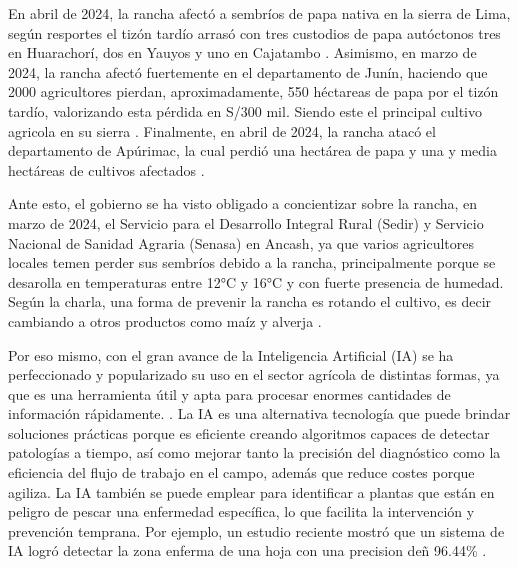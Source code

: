  En abril de 2024, la rancha afectó a sembríos de papa nativa en la sierra de Lima, según resportes el tizón tardío arrasó con tres custodios de papa autóctonos tres en Huarachorí, dos en Yauyos y uno en Cajatambo \parencite{cr_rancha3}. Asimismo, en marzo de 2024, la rancha afectó fuertemente en el departamento de Junín, haciendo que 2000 agricultores pierdan, aproximadamente, 550 héctareas de papa por el tizón tardío, valorizando esta pérdida en S/300 mil. Siendo este el principal cultivo agricola en su sierra \parencite{cr_rancha4}. Finalmente, en abril de 2024, la rancha atacó el departamento de Apúrimac, la cual perdió una hectárea de papa y una y media hectáreas de cultivos afectados \parencite{cr_rancha5}.
 
 Ante esto, el gobierno se ha visto obligado a concientizar sobre la rancha, en marzo de 2024, el Servicio para el Desarrollo Integral Rural (Sedir) y Servicio Nacional de Sanidad Agraria (Senasa) en Ancash, ya que varios agricultores locales temen perder sus sembríos debido a la rancha, principalmente porque se desarolla en temperaturas entre 12°C y 16°C y con fuerte presencia de humedad. Según la charla, una forma de prevenir la rancha es rotando el cultivo, es decir cambiando a otros productos como maíz y alverja \parencite{cr_agroinforma2}.
 
 Por eso mismo, con el gran avance de la Inteligencia Artificial (IA) se ha perfeccionado y popularizado su uso en el sector agrícola de distintas formas, ya que es una herramienta útil y apta para procesar enormes cantidades de información rápidamente. . La IA es una alternativa tecnología que puede brindar soluciones prácticas porque es eficiente creando algoritmos capaces de detectar patologías a tiempo, así como mejorar tanto la precisión del diagnóstico como la eficiencia del flujo de trabajo en el campo, además que reduce costes porque agiliza. La IA también se puede emplear para identificar a plantas que están en peligro de pescar una enfermedad específica, lo que facilita la intervención y prevención temprana. Por ejemplo, un estudio reciente mostró que un sistema de IA logró detectar la zona enferma de una hoja con una precision deñ 96.44\% \parencite{cr_iaplanta}.
 
